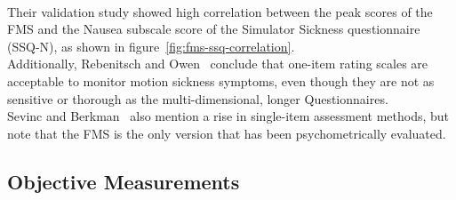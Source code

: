 \\
Their validation study showed high correlation between the peak scores of the FMS and the Nausea subscale score of
the Simulator Sickness questionnaire (SSQ-N), as shown in figure~\ref{fig:fms-ssq-correlation}.
\\
Additionally, Rebenitsch and Owen~\cite{Rebenitsch2016} conclude that one-item rating scales are acceptable to
monitor motion sickness symptoms, even though they are not as sensitive or thorough as the multi-dimensional, longer
Questionnaires.
\\
Sevinc and Berkman~\cite{Sevinc2020} also mention a rise in single-item assessment methods, but note that the FMS is
the only version that has been psychometrically evaluated.


\subsection{Objective Measurements}\label{subsec:objective-measurements}

